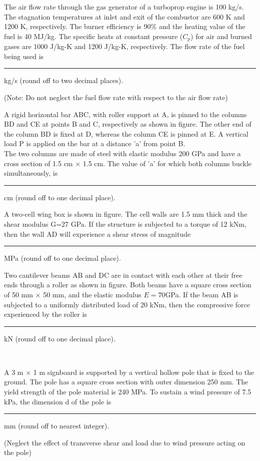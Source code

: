 \item The air flow rate through the gas generator of a turboprop engine is 100 kg/s. The stagnation temperatures at inlet and exit of the combustor are 600 K and 1200 K, respectively. The burner efficiency is 90\% and the heating value of the fuel is 40 MJ/kg. The specific heats at constant pressure ($C_p$) for air and burned gases are 1000 J/kg-K and 1200 J/kg-K, respectively. The flow rate of the fuel being used is \rule{1.5cm}{0.4pt} kg/s (round off to two decimal places).

(Note: Do not neglect the fuel flow rate with respect to the air flow rate)

\item A rigid horizontal bar ABC, with roller support at A, is pinned to the columns BD and CE at points B and C, respectively as shown in figure. The other end of the column BD is fixed at D, whereas the column CE is pinned at E. A vertical load P is applied on the bar at a distance 'a' from point B.\\
The two columns are made of steel with elastic modulus 200 GPa and have a cross section of 1.5 cm $\times$ 1.5 cm. The value of 'a' for which both columns buckle simultaneously, is \rule{2cm}{0.4pt}cm (round off to one decimal place).



\item A two-cell wing box is shown in figure. The cell walls are 1.5 mm thick and the shear modulus G=27 GPa. If the structure is subjected to a torque of 12 kNm, then the wall AD will experience a shear stress of magnitude \rule{2cm}{0.4pt}MPa (round off to one decimal place).


\item Two cantilever beams AB and DC are in contact with each other at their free ends through a roller as shown in figure. Both beams have a square cross section of 50 mm $\times$ 50 mm, and the elastic modulus $E=70 $GPa. If the beam AB is subjected to a uniformly distributed load of 20 kNm, then the compressive force experienced by the roller is \rule{2cm}{0.4pt}kN (round off to one decimal place).

\\
\item A 3 m $\times$ 1 m signboard is supported by a vertical hollow pole that is fixed to the ground. The pole has a square cross section with outer dimension 250 mm. The yield strength of the pole material is 240 MPa. To sustain a wind pressure of 7.5 kPa, the dimension d of the pole is \rule{2cm}{0.4pt}mm (round off to nearest integer).

(Neglect the effect of transverse shear and load due to wind pressure acting on the pole)



